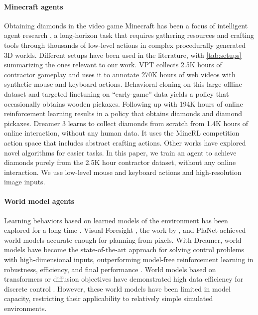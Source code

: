 \documentclass[11pt]{article}
\begin{document}
\paragraph{Minecraft agents}

Obtaining diamonds in the video game Minecraft has been a focus of intelligent agent research \citep{johnson2016malmo,guss2019minerl,kanervisto2022minerlcomp,kanitscheider2021minecraftcurriculum}, a long-horizon task that requires gathering resources and crafting tools through thousands of low-level actions in complex procedurally generated 3D worlds.
Different setups have been used in the literature, with \cref{tab:setups} summarizing the ones relevant to our work.
VPT \citep{vpt} collects 2.5K hours of contractor gameplay and uses it to annotate 270K hours of web videos with synthetic mouse and keyboard actions.
Behavioral cloning on this large offline dataset and targeted finetuning on ``early-game'' data yields a policy that occasionally obtains wooden pickaxes.
Following up with 194K hours of online reinforcement learning results in a policy that obtains diamonds and diamond pickaxes.
Dreamer 3 \citep{dreamerv3} learns to collect diamonds from scratch from 1.4K hours of online interaction, without any human data.
It uses the MineRL competition action space that includes abstract crafting actions.
Other works have explored novel algorithms for easier tasks\citep{lifshitz2023steve1,cai2023minecraftgroot,zhou2024minedreamer,nieto2021minecraftskills}.
In this paper, we train an agent to achieve diamonds purely from the 2.5K hour contractor dataset, without any online interaction.
We use low-level mouse and keyboard actions and high-resolution image inputs.

\paragraph{World model agents}

Learning behaviors based on learned models of the environment has been explored for a long time \citep{sutton1991dyna,deisenroth2011pilco,watter2015e2c}.
Visual Foresight \citep{finn2017visualforesight}, the work by \citet{ha2018worldmodels}, and PlaNet \citep{hafner2018planet} achieved world models accurate enough for planning from pixels.
With Dreamer, world models have become the state-of-the-art approach for solving control problems with high-dimensional inputs, outperforming model-free reinforcement learning in robustness, efficiency, and final performance \citep{hafner2019dreamer,hafner2020dreamerv2,dreamerv3}.
World models based on transformers or diffusion objectives have demonstrated high data efficiency for discrete control \citep{micheli2022iris,robine2023twm,storm}.
However, these world models have been limited in model capacity, restricting their applicability to relatively simple simulated environments.
\end{document}
